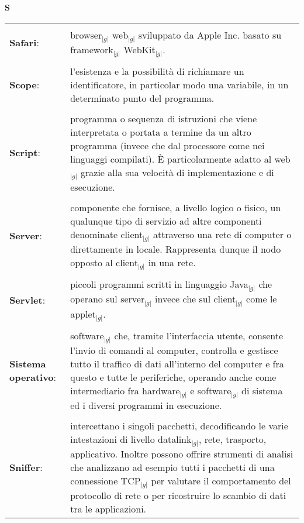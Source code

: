 \hfill\Huge{\textbf{S}}\\
\normalsize
	\begin{longtable}{p{} p{}} 
	    \toprule
	    \\
	    \textbf{Safari}:			&	browser$_{|g|}$ web$_{|g|}$ sviluppato da Apple Inc. basato su framework$_{|g|}$ WebKit$_{|g|}$.\\
	    \\
	    \textbf{Scope}: 			&	l'esistenza e la possibilità di richiamare un identificatore, in particolar modo una variabile, in un determinato punto del programma.\\
	    \\
	    \textbf{Script}:			&	programma o sequenza di istruzioni che viene interpretata o portata a termine da un altro programma (invece che dal processore come nei linguaggi compilati). \`E particolarmente adatto al web$_{|g|}$ 
							grazie alla sua velocità di implementazione e di esecuzione. \\
	    \\
	    \textbf{Server}:			&	componente che fornisce, a livello logico o fisico, un qualunque tipo di servizio ad altre componenti denominate client$_{|g|}$ attraverso una rete di computer o direttamente in locale. Rappresenta 
							dunque il nodo opposto al client$_{|g|}$ in una rete.\\
	    \\
	    \textbf{Servlet}:			&	piccoli programmi scritti in linguaggio Java$_{|g|}$ che operano sul server$_{|g|}$ invece che sul client$_{|g|}$ come le applet$_{|g|}$.\\
	    \\
	    \textbf{Sistema operativo}:		&	software$_{|g|}$ che, tramite l’interfaccia utente, consente l’invio di comandi al computer, controlla e gestisce tutto il traffico di dati all’interno del 
							computer e fra questo e tutte le periferiche, operando anche come intermediario fra hardware$_{|g|}$ e software$_{|g|}$ di sistema ed i diversi programmi in esecuzione.\\
	    \\
	    \textbf{Sniffer}: 			&	intercettano i singoli pacchetti, decodificando le varie intestazioni di livello datalink$_{|g|}$, rete, trasporto, applicativo. Inoltre possono offrire strumenti di analisi che analizzano ad esempio tutti i pacchetti 
							di una connessione TCP$_{|g|}$ per valutare il comportamento del protocollo di rete o per ricostruire lo scambio di dati tra le applicazioni.\\

\end{longtable}
